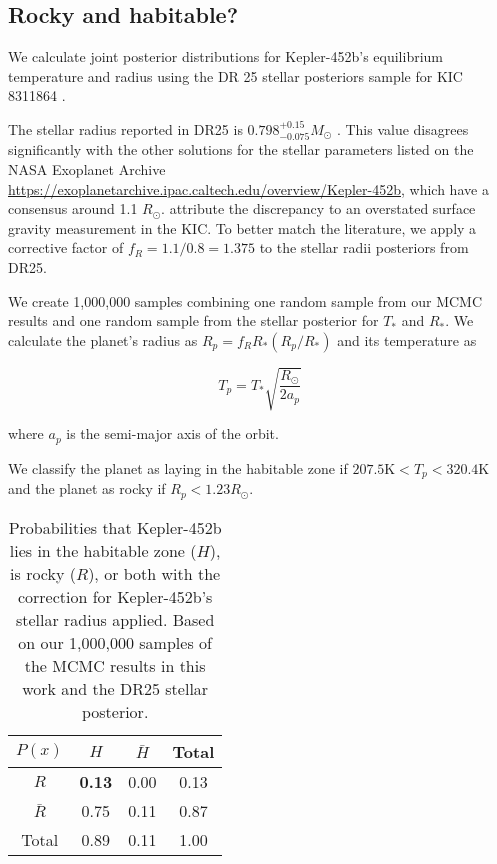 \documentclass[modern]{aastex631}
\begin{document}
\subsection{Rocky and habitable?}

We calculate joint posterior distributions for Kepler-452b's equilibrium temperature and radius using the DR 25 stellar posteriors sample for KIC 8311864 \citep{mathurRevisedStellarProperties2017}.

The stellar radius reported in DR25 is $0.798^{+0.15}_{-0.075} M_\odot$ \citep{mathurRevisedStellarProperties2017}. This value disagrees significantly with the other solutions for the stellar parameters listed on the NASA Exoplanet Archive \url{https://exoplanetarchive.ipac.caltech.edu/overview/Kepler-452b}, which have a consensus around 1.1 $R_\odot$. \citet{jenkinsDISCOVERYVALIDATIONKepler452b2015} attribute the discrepancy to an overstated surface gravity measurement in the KIC. To better match the literature, we apply a corrective factor of $f_R = 1.1/0.8 = 1.375$ to the stellar radii posteriors from DR25. 

We create 1,000,000 samples combining one random sample from our MCMC results and one random sample from the stellar posterior for $T_\ast$ and $R_\ast$. We calculate the planet's radius as $R_p = f_R R_\ast \left(R_p / R_\ast\right)$ and its temperature as

\begin{equation}
    T_p = T_\ast \sqrt{\frac{R_\odot}{2 a_p}}
\end{equation}

where $a_p$ is the semi-major axis of the orbit.

We classify the planet as laying in the habitable zone if $207.5 \mathrm{K} < T_p < 320.4 \mathrm{K}$ and the  planet as rocky if $R_p < 1.23 R_\odot$.

\begin{table}[!ht]
    \centering
    \begin{tabular}{c|cc|c}
    $P(x)$ & $H$ & $\bar{H}$ & Total\\
    \hline
    $R$ & \textbf{0.13} & 0.00 & 0.13 \\
    $\bar{R}$ & 0.75 & 0.11 & 0.87\\
    \hline
    Total & 0.89 & 0.11 & 1.00
    \end{tabular}    \caption{Probabilities that Kepler-452b lies in the habitable zone ($H$), is rocky ($R$), or both with the correction for Kepler-452b's stellar radius applied. Based on our 1,000,000 samples of the MCMC results in this work and the DR25 stellar posterior.}
    \label{tab:tab2}
\end{table}
\end{document}
